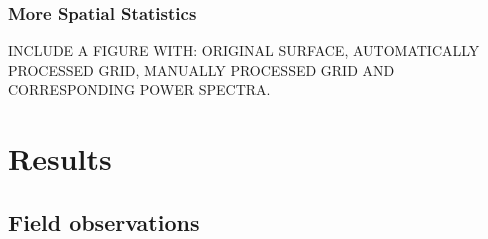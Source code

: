 \documentclass[12pt,a4paper]{article}
\begin{document}
		\subsubsection{More Spatial Statistics}
	

INCLUDE A FIGURE WITH: ORIGINAL SURFACE, AUTOMATICALLY PROCESSED GRID, MANUALLY PROCESSED GRID AND CORRESPONDING POWER SPECTRA.

\section{Results}

	\subsection{Field observations}
	
\end{document}
